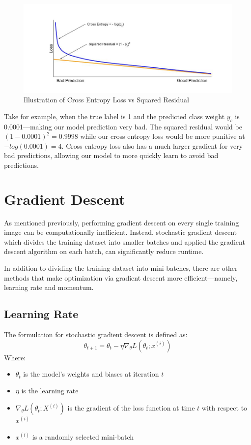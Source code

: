 \documentclass [MAS] {uclathes}
\begin{document}
\begin{figure}[H]
    \centering
    \includegraphics[width=1\linewidth]{figures/CE vs Square Residual.jpg}
    \caption{Illustration of Cross Entropy Loss vs Squared Residual}
    \label{fig:enter-label}
\end{figure}

Take for example, when the true label is 1 and the predicted class weight \(y_{c}\) is 0.0001---making our model 
prediction very bad. The squared residual would be \((1-0.0001)^{2} = 0.9998\) while our cross entropy loss would be 
more punitive at \(-log(0.0001) = 4\). Cross entropy loss also has a much larger gradient for very bad predictions, 
allowing our model to more quickly learn to avoid bad predictions.

\section{Gradient Descent}
As mentioned previously, performing gradient descent on every single training image can be computationally inefficient. 
Instead, stochastic gradient descent which divides the training dataset into smaller batches and applied the gradient 
descent algorithm on each batch, can significantly reduce runtime. 

In addition to dividing the training dataset into mini-batches, there are other methods that make optimization via 
gradient descent more efficient---namely, learning rate and momentum.

\subsection{Learning Rate}
The formulation for stochastic gradient descent is defined as:
\[\theta_{t+1} = \theta_{t} - \eta\nabla_{\theta}L(\theta_{t};x^{(i)})\]
Where:
\begin{itemize}
    \item \(\theta_{t}\) is the model's weights and biases at iteration \(t\)
    \item \(\eta\) is the learning rate
    \item \(\nabla_{\theta}L(\theta_{t};X^{(i)})\) is the gradient of the loss function at time \(t\) with respect to 
    \(x^{(i)}\)
    \item \(x^{(i)}\) is a randomly selected mini-batch
\end{itemize}
\end{document}
